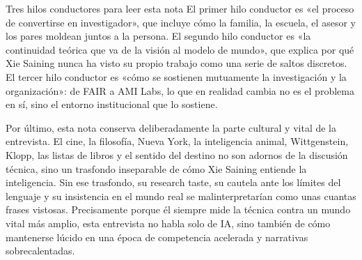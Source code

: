 \begin{importantbox}{Tres hilos conductores para leer esta nota}
El primer hilo conductor es «el proceso de convertirse en investigador», que incluye cómo la familia, la escuela, el asesor y los pares moldean juntos a la persona. El segundo hilo conductor es «la continuidad teórica que va de la visión al modelo de mundo», que explica por qué Xie Saining nunca ha visto su propio trabajo como una serie de saltos discretos. El tercer hilo conductor es «cómo se sostienen mutuamente la investigación y la organización»: de FAIR a AMI Labs, lo que en realidad cambia no es el problema en sí, sino el entorno institucional que lo sostiene.
\end{importantbox}

Por último, esta nota conserva deliberadamente la parte cultural y vital de la entrevista. El cine, la filosofía, Nueva York, la inteligencia animal, Wittgenstein, Klopp, las listas de libros y el sentido del destino no son adornos de la discusión técnica, sino un trasfondo inseparable de cómo Xie Saining entiende la inteligencia. Sin ese trasfondo, su research taste, su cautela ante los límites del lenguaje y su insistencia en el mundo real se malinterpretarían como unas cuantas frases vistosas. Precisamente porque él siempre mide la técnica contra un mundo vital más amplio, esta entrevista no habla solo de IA, sino también de cómo mantenerse lúcido en una época de competencia acelerada y narrativas sobrecalentadas.

